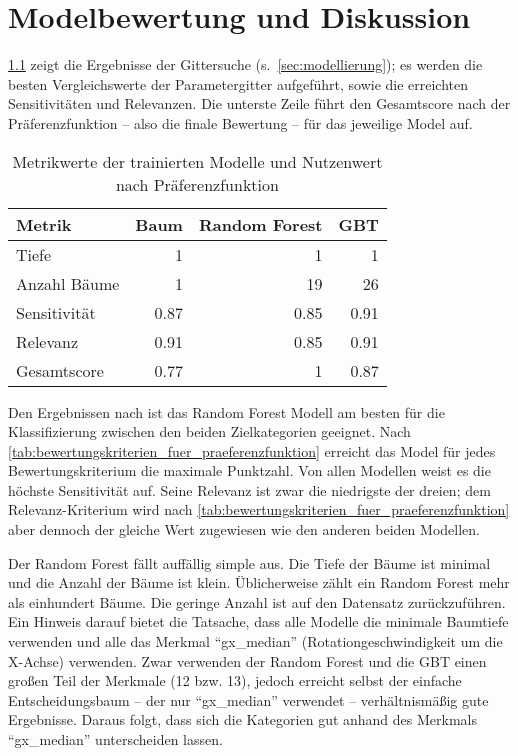 \chapter{Modelbewertung und Diskussion}
\label{ch:modelbewertung}
\cref{tab:metrikwerte_der_trainierten_modelle} zeigt die Ergebnisse der Gittersuche (s.~\cref{sec:modellierung}); es werden die besten Vergleichswerte der Parametergitter aufgeführt, sowie die erreichten Sensitivitäten und Relevanzen. Die unterste Zeile führt den Gesamtscore nach der Präferenzfunktion -- also die finale Bewertung -- für das jeweilige Model auf.

\begin{table}[ht]
	\begin{tabularx}{\textwidth}{ | l | r | r | r|}
		\hline
		\rowcolor{lightgray}
		Metrik & Baum & Random Forest & GBT\\
		\hline
		Tiefe & 1 & 1 & 1\\
		Anzahl Bäume & 1 & 19 & 26\\
		Sensitivität & \num{0.87} & \num{0.85} & \num{0.91}\\
		Relevanz & \num{0.91} & \num{0.85} & \num{0.91}\\
		\hline
		\hline
		Gesamtscore & \num{0.77} & \num{1} & \num{0.87}\\
		\hline
	\end{tabularx}
	\caption{Metrikwerte der trainierten Modelle und Nutzenwert nach Präferenzfunktion}%
	\label{tab:metrikwerte_der_trainierten_modelle}	%
\end{table}

Den Ergebnissen nach ist das Random Forest Modell am besten für die Klassifizierung zwischen den beiden Zielkategorien geeignet. Nach \cref{tab:bewertungskriterien_fuer_praeferenzfunktion} erreicht das Model für jedes Bewertungskriterium die maximale Punktzahl. Von allen Modellen weist es die höchste Sensitivität auf. Seine Relevanz ist zwar die niedrigste der dreien; dem Relevanz-Kriterium wird nach \cref{tab:bewertungskriterien_fuer_praeferenzfunktion} aber dennoch der gleiche Wert zugewiesen wie den anderen beiden Modellen.

Der Random Forest fällt auffällig simple aus. Die Tiefe der Bäume ist minimal und die Anzahl der Bäume ist klein. Üblicherweise zählt ein Random Forest mehr als einhundert Bäume. Die geringe Anzahl ist auf den Datensatz zurückzuführen. Ein Hinweis darauf bietet die Tatsache, dass alle Modelle die minimale Baumtiefe verwenden und alle das Merkmal \enquote{gx\_median} (Rotationgeschwindigkeit um die X-Achse) verwenden. Zwar verwenden der Random Forest und die GBT einen großen Teil der Merkmale (12 bzw. 13), jedoch erreicht selbst der einfache Entscheidungsbaum -- der nur \enquote{gx\_median} verwendet -- verhältnismäßig gute Ergebnisse. Daraus folgt, dass sich die Kategorien gut anhand des Merkmals \enquote{gx\_median} unterscheiden lassen.

